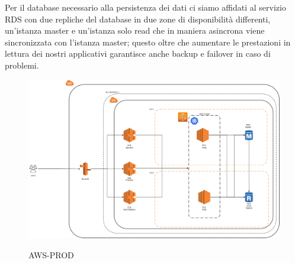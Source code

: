 \documentclass{article}
\begin{document}
Per il database necessario alla persistenza dei dati ci siamo affidati al servizio RDS con due repliche del database in due zone di disponibilità differenti, un’istanza master e un’istanza solo read che in maniera asincrona viene sincronizzata con l’istanza master; questo oltre che aumentare le prestazioni in lettura dei nostri applicativi garantisce anche backup e failover in caso di problemi.\\
\begin{figure}[h!]
\centering
\includegraphics[scale=0.2]{AWS-PROD.png}
\label{fig:AWS-PROD}
\caption{AWS-PROD}
\end{figure}
\clearpage
\end{document}

